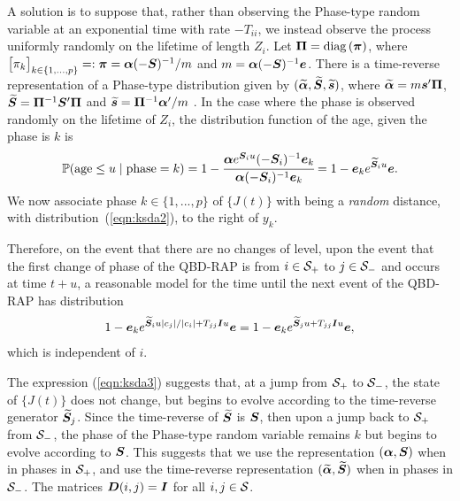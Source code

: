 A solution is to suppose that, rather than observing the Phase-type random variable at an exponential time with rate \(-T_{ii}\), we instead observe the process uniformly randomly on the lifetime of length \(Z_i\). Let \(\boldsymbol \Pi = \mathrm{diag}\left(\boldsymbol \pi \right)\), where \(\begin{bmatrix} \pi_k \end{bmatrix}_{k\in\{1,\dots,p\}}=:\boldsymbol \pi=\boldsymbol \alpha (-\boldsymbol{S})^{-1}/m\) and \(m=\boldsymbol \alpha (-\boldsymbol{S})^{-1}\boldsymbol e\). There is a time-reverse representation of a Phase-type distribution given by \((\widetilde{\boldsymbol \alpha}, \widetilde{\boldsymbol S}, \widetilde{\boldsymbol s})\), where \(\widetilde{\boldsymbol \alpha} = m\boldsymbol s' \boldsymbol \Pi \), \(\widetilde{\boldsymbol S} = \boldsymbol\Pi^{-1}\boldsymbol S'\boldsymbol \Pi\) and \(\widetilde{\boldsymbol s} = \boldsymbol \Pi^{-1}\boldsymbol \alpha'/m\) \cite[Page 91]{a2008}. In the case where the phase is observed randomly on the lifetime of \(Z_i\), the distribution function of the age, given the phase is \(k\) is \cite[Lemma 3.1]{hmp2017}
\begin{align}\mathbb P(\mbox{age}\leq u \mid \mbox{phase}=k) = 1-\cfrac{\boldsymbol \alpha e^{\boldsymbol S_iu}(-\boldsymbol S_i)^{-1}\boldsymbol e_k}{\boldsymbol \alpha (-\boldsymbol S_i)^{-1}\boldsymbol e_k} = 1- \boldsymbol e_k e^{\widetilde{ \boldsymbol S}_iu}\boldsymbol e.\label{eqn:ksda2}\end{align}
We now associate phase \(k\in\{1,...,p\}\) of \(\{J(t)\}\) with being a \emph{random} distance, with distribution~(\ref{eqn:ksda2}), to the right of \(y_k\).

Therefore, on the event that there are no changes of level, upon the event that the first change of phase of the QBD-RAP is from \(i\in\mathcal{S}_+\) to \(j\in\mathcal{S}_-\) and occurs at time \(t+u\), a reasonable model for the time until the next event of the QBD-RAP has distribution 
\begin{align}
	1- \boldsymbol e_k e^{\widetilde{ \boldsymbol S}_iu|c_j|/|c_i| + T_{jj}\boldsymbol Iu}\boldsymbol e = 1- \boldsymbol e_k e^{\widetilde{ \boldsymbol S}_ju+ T_{jj}\boldsymbol Iu}\boldsymbol e,\label{eqn:ksda3}
\end{align}
which is independent of \(i\). 

The expression (\ref{eqn:ksda3}) suggests that, at a jump from \(\mathcal{S}_+\) to \(\mathcal{S}_-\), the state of \(\{J(t)\}\) does not change, but begins to evolve according to the time-reverse generator \(\widetilde{\boldsymbol S}_j\). Since the time-reverse of \(\widetilde{\boldsymbol S}\) is \(\boldsymbol S\), then upon a jump back to \(\mathcal{S}_+\) from \(\mathcal{S}_-\), the phase of the Phase-type random variable remains \(k\) but begins to evolve according to \(\boldsymbol S\). This suggests that we use the representation \((\boldsymbol \alpha, \boldsymbol S)\) when in phases in \(\mathcal{S}_+\), and use the time-reverse representation \((\widetilde{\boldsymbol \alpha}, \widetilde{\boldsymbol S})\) when in phases in \(\mathcal{S}_-\). The matrices \(\boldsymbol D(i,j)=\boldsymbol I\) for all \(i,j\in\mathcal{S}\). 

